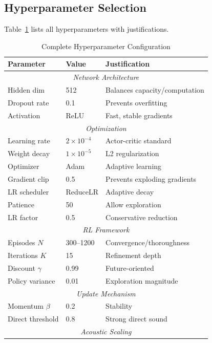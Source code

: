 \documentclass[12pt,a4paper]{article}
\begin{document}
\subsection{Hyperparameter Selection}

Table~\ref{tab:hyperparameters_detailed} lists all hyperparameters with justifications.

\begin{table}[h]
\centering
\caption{Complete Hyperparameter Configuration}
\label{tab:hyperparameters_detailed}
\small
\begin{tabular}{@{}lll@{}}
\toprule
\textbf{Parameter} & \textbf{Value} & \textbf{Justification} \\
\midrule
\multicolumn{3}{c}{\textit{Network Architecture}} \\
\midrule
Hidden dim & 512 & Balances capacity/computation \\
Dropout rate & 0.1 & Prevents overfitting \\
Activation & ReLU & Fast, stable gradients \\
\midrule
\multicolumn{3}{c}{\textit{Optimization}} \\
\midrule
Learning rate & $2\times10^{-4}$ & Actor-critic standard \\
Weight decay & $1\times10^{-5}$ & L2 regularization \\
Optimizer & Adam & Adaptive learning \\
Gradient clip & 0.5 & Prevents exploding gradients \\
LR scheduler & ReduceLR & Adaptive decay \\
Patience & 50 & Allow exploration \\
LR factor & 0.5 & Conservative reduction \\
\midrule
\multicolumn{3}{c}{\textit{RL Framework}} \\
\midrule
Episodes $N$ & 300--1200 & Convergence/thoroughness \\
Iterations $K$ & 15 & Refinement depth \\
Discount $\gamma$ & 0.99 & Future-oriented \\
Policy variance & 0.01 & Exploration magnitude \\
\midrule
\multicolumn{3}{c}{\textit{Update Mechanism}} \\
\midrule
Momentum $\beta$ & 0.2 & Stability \\
Direct threshold & 0.8 & Strong direct sound \\
\midrule
\multicolumn{3}{c}{\textit{Acoustic Scaling}} \\

\end{tabular}
\end{table}
\end{document}

